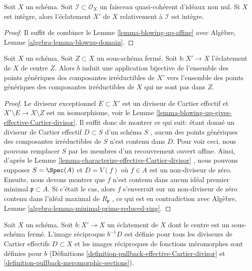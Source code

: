 \begin{lemma}
\label{lemma-blow-up-integral-scheme}
Soit  $X$  un schéma. Soit  $\mathcal{I} \subset \mathcal{O}_X$  un faisceau quasi-cohérent d'idéaux
non nul. Si  $X$  est intègre, alors l'éclatement  $X'$  de  $X$ 
relativement à  $\mathcal{I}$  est intègre.
\end{lemma}

\begin{proof}
Il suffit de combiner le Lemme  \ref{lemma-blowing-up-affine}  avec Algèbre, Lemme  \ref{algebra-lemma-blowup-domain}.
\end{proof}

\begin{lemma}
\label{lemma-blow-up-and-irreducible-components}
Soit  $X$  un schéma. Soit  $Z \subset X$  un sous-schéma fermé. Soit
 $b : X' \to X$  l'éclatement de  $X$  de centre  $Z$. Alors  $b$ 
induit une application bijective de l'ensemble des points génériques des
composantes irréductibles de  $X'$  vers l'ensemble des points génériques
des composantes irréductibles de  $X$  qui ne sont pas dans  $Z$.
\end{lemma}

\begin{proof}
Le diviseur exceptionnel  $E \subset X'$  est un diviseur de Cartier effectif et
 $X' \setminus E \to X \setminus Z$  est un isomorphisme, voir le Lemme  \ref{lemma-blowing-up-gives-effective-Cartier-divisor}. Il suffit donc de
montrer ce qui suit: étant donné un diviseur de Cartier effectif  $D \subset S$  d'un
schéma  $S$ , aucun des points génériques des composantes irréductibles de
 $S$  n'est contenu dans  $D$. Pour voir ceci, nous pouvons
remplacer  $S$  par les membres d'un recouvrement ouvert affine. Ainsi,
d'après le Lemme  \ref{lemma-characterize-effective-Cartier-divisor} , nous pouvons supposer  $S = \Spec(A)$  et  $D = V(f)$ 
où  $f \in A$  est un non-diviseur de zéro. Ensuite, nous devons montrer que
 $f$  n'est contenu dans aucun idéal premier minimal  $\mathfrak p \subset A$. Si
c'était le cas, alors  $f$  s'enverrait sur un non-diviseur de zéro
contenu dans l'idéal maximal de  $R_\mathfrak p$ , ce qui est en contradiction avec
Algèbre, Lemme  \ref{algebra-lemma-minimal-prime-reduced-ring}.
\end{proof}

\begin{lemma}
\label{lemma-blow-up-pullback-effective-Cartier}
Soit  $X$  un schéma. Soit  $b : X' \to X$  un éclatement de  $X$  dont le centre est
un sous-schéma fermé. L'image réciproque  $b^{-1}D$  est définie pour tous les
diviseurs de Cartier effectifs  $D \subset X$  et les images réciproques de fonctions
méromorphes sont définies pour  $b$  (Définitions  \ref{definition-pullback-effective-Cartier-divisor}  et
 \ref{definition-pullback-meromorphic-sections}).
\end{lemma}

